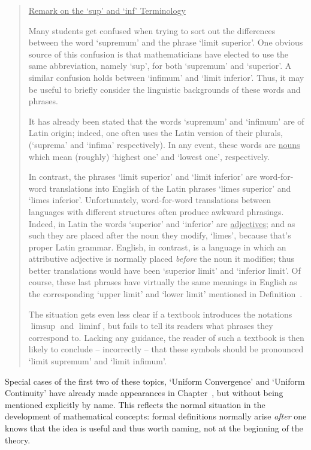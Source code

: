 \begin{quotation}
{\footnotesize \underline{Remark on the `sup' and `inf' Terminology}

        Many students get confused when trying to sort out the differences between the word `supremum' and the phrase `limit superior'.
    One obvious source of this confusion is that mathematicians have elected to use the same abbreviation, namely `sup', for both `supremum' and `superior'.
    A similar confusion holds between `infimum' and `limit inferior'.
    Thus, it may be useful to briefly consider the linguistic backgrounds of these words and phrases.

       It has already been stated that the words `supremum' and `infimum' are of Latin origin;
    indeed, one often uses the Latin version of their plurals, (`suprema' and  `infima' respectively).
    In any event, these words are \underline{nouns} which mean (roughly) `highest one' and `lowest one', respectively.

        In contrast, the phrases `limit superior' and `limit inferior' are word-for-word translations into English of the Latin phrases `limes superior' and `limes inferior'.
    Unfortunately, word-for-word translations between languages with different structures often produce awkward phrasings.
    Indeed,  in Latin the words `superior' and `inferior' are \underline{adjectives}; and as such they are placed after the noun they modify, `limes', because that's proper Latin grammar.
    English, in contrast, is a language in which an attributive adjective is normally placed {\em before} the noun it modifies;
    thus  better translations would have been `superior limit' and `inferior limit'.
    Of course, these last phrases have virtually the same meanings in English as the corresponding `upper limit' and `lower limit' mentioned in Definition~.

        The situation gets even less clear if a textbook introduces the notations $\limsup$ and $\liminf$,
    but fails to tell its readers what phrases they correspond to.
    Lacking any guidance, the reader of such a textbook is then likely to conclude -- incorrectly -- that these symbols should be pronounced `limit supremum' and `limit infimum'.
}%
\end{quotation}



        Special cases of the first two of these topics, `Uniform Convergence' and `Uniform Continuity'
    have already made appearances in Chapter~, but without being mentioned explicitly by name.
    This reflects the normal situation in the development of mathematical concepts:
    formal definitions normally arise {\em after} one knows that the idea is useful and thus worth naming, not at the beginning of the theory.

